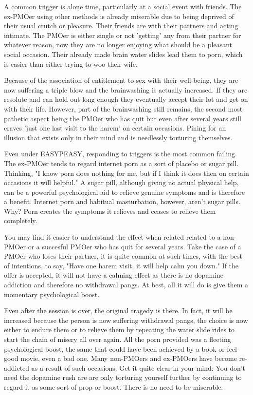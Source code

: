 \documentclass[easypeasy.tex]{subfiles}
\begin{document}
A common trigger is alone time, particularly at a social event with friends. The ex-PMOer using other methods is already miserable due to being deprived of their usual crutch or pleasure. Their friends are with their partners and acting intimate. The PMOer is either single or not 'getting' any from their partner for whatever reason, now they are no longer enjoying what should be a pleasant social occasion. Their already made brain water slides lead them to porn, which is easier than either trying to woo their wife.

Because of the association of entitlement to sex with their well-being, they are now suffering a triple blow and the brainwashing is actually increased. If they are resolute and can hold out long enough they eventually accept their lot and get on with their life. However, part of the brainwashing still remains, the second most pathetic aspect being the PMOer who has quit but even after several years still craves 'just one last visit to the harem' on certain occasions. Pining for an illusion that exists only in their mind and is needlessly torturing themselves.

Even under EASYPEASY, responding to triggers is the most common failing. The ex-PMOer tends to regard internet porn as a sort of placebo or sugar pill. Thinking, "I know porn does nothing for me, but if I think it does then on certain occasions it will helpful." A sugar pill, although giving no actual physical help, can be a powerful psychological aid to relieve genuine symptoms and is therefore a benefit. Internet porn and habitual masturbation, however, aren't sugar pills. Why? Porn creates the symptoms it relieves and ceases to relieve them completely.

You may find it easier to understand the effect when related related to a non-PMOer or a succesful PMOer who has quit for several years. Take the case of a PMOer who loses their partner, it is quite common at such times, with the best of intentions, to say, "Have one harem visit, it will help calm you down." If the offer is accepted, it will not have a calming effect as there is no dopamine addiction and therefore no withdrawal pangs. At best, all it will do is give them a momentary psychological boost.

Even after the session is over, the original tragedy is there. In fact, it will be increased because the person is now suffering withdrawal pangs, the choice is now either to endure them or to relieve them by repeating the water slide rides to start the chain of misery all over again. All the porn provided was a fleeting psychological boost, the same that could have been achieved by a book or feel-good movie, even a bad one. Many non-PMOers and ex-PMOers have become re-addicted as a result of such occasions. Get it quite clear in your mind: You don't need the dopamine rush are are only torturing yourself further by continuing to regard it as some sort of prop or boost. There is no need to be miserable.
\end{document}
